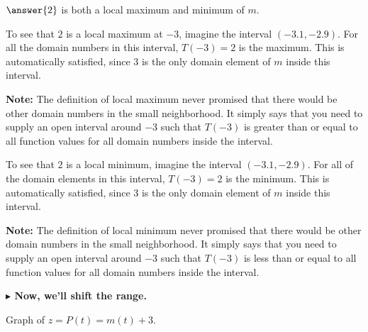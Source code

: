 \documentclass{ximera}
\begin{document}
\begin{example}
\begin{itemize}
\end{itemize}


$\answer{2}$ is both a local maximum and minimum of $m$.  

To see that $2$ is a local maximum at $-3$, imagine the interval $(-3.1, -2.9)$. For all the domain numbers in this interval, $T(-3)=2$ is the maximum.  This is automatically satisfied, since $3$ is the only domain element of $m$ inside this interval.  

\textbf{Note:} The definition of local maximum never promised that there would be other domain numbers in the small neighborhood.  It simply says that you need to supply an open interval around $-3$ such that $T(-3)$ is greater than or equal to all function values for all domain numbers inside the interval. 

To see that $2$ is a local minimum, imagine the interval $(-3.1, -2.9)$. For all of the domain elements in this interval, $T(-3)=2$ is the minimum.  This is automatically satisfied, since $3$ is the only domain element of $m$ inside this interval.  


\textbf{Note:} The definition of local minimum never promised that there would be other domain numbers in the small neighborhood.  It simply says that you need to supply an open interval around $-3$ such that $T(-3)$ is less than or equal to all function values for all domain numbers inside the interval. 



\textbf{\textcolor{blue!55!black}{$\blacktriangleright$ Now, we'll shift the range.}} 




Graph of $z = P(t) = m(t)+3$.

\begin{image}
\end{image}
\end{example}
\end{document}
